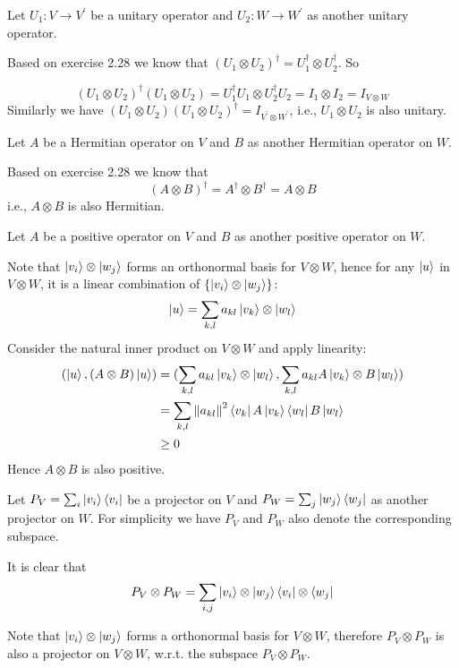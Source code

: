 \documentclass{homeworg}
\begin{document}
\exercise*
Let $U_1:V\to V^\prime$ be a unitary operator and $U_2:W\to W^\prime$ as another unitary operator.

Based on exercise 2.28 we know that $(U_1\otimes U_2)^\dagger=U_1^\dagger\otimes U_2^\dagger$. So

\[(U_1\otimes U_2)^\dagger(U_1\otimes U_2)=U_1^\dagger U_1\otimes U_2^\dagger U_2=I_1\otimes I_2=I_{V\otimes W}\]
Similarly we have $(U_1\otimes U_2)(U_1\otimes U_2)^\dagger=I_{V^\prime\otimes W^\prime}$, i.e., $U_1\otimes U_2$ is also unitary.

\exercise*
Let $A$ be a Hermitian operator on $V$ and $B$ as another Hermitian operator on $W$.

Based on exercise 2.28 we know that
\[(A\otimes B)^\dagger=A^\dagger\otimes B^\dagger=A\otimes B\]
i.e., $A\otimes B$ is also Hermitian.

\exercise*
Let $A$ be a positive operator on $V$ and $B$ as another positive operator on $W$. 

Note that $\ket{v_i}\otimes\ket{w_j}$ forms an orthonormal basis for $V\otimes W$, hence for any $\ket{u}$ in $V\otimes W$, it is a linear combination of $\{\ket{v_i}\otimes\ket{w_j}\}$:
\[\ket{u}=\sum_{k,l}a_{kl}\ket{v_k}\otimes\ket{w_l}\]
Consider the natural inner product on $V\otimes W$ and apply linearity:
\begin{align}
(\ket{u},(A\otimes B)\ket{u})&=(\sum_{k,l}a_{kl}\ket{v_k}\otimes\ket{w_l}, \sum_{k,l}a_{kl}A\ket{v_k}\otimes B\ket{w_l})\nonumber\\
&=\sum_{k,l}\left\|a_{kl}\right\|^2\bra{v_k}A\ket{v_k}\bra{w_l}B\ket{w_l}\nonumber\\
&\geq 0\nonumber
\end{align}
Hence $A\otimes B$ is also positive.

\exercise*
Let $P_V=\sum_i \ket{v_i}\bra{v_i}$ be a projector on $V$ and $P_W=\sum_j\ket{w_j}\bra{w_j}$ as another projector on $W$.
For simplicity we have $P_V$ and $P_W$ also denote the corresponding subspace.

It is clear that
\[P_V\otimes P_W=\sum_{i,j}\ket{v_i}\otimes\ket{w_j}\bra{v_i}\otimes\bra{w_j}\]

Note that $\ket{v_i}\otimes\ket{w_j}$ forms a orthonormal basis for $V\otimes W$, therefore $P_V\otimes P_W$ is also a projector on $V\otimes W$, w.r.t. the subspace $P_V\otimes P_W$.
\end{document}
